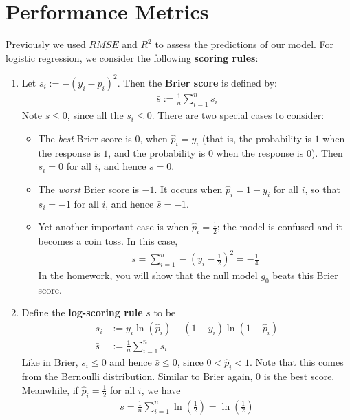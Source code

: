 \documentclass[12pt, a4paper]{article}
\theoremstyle{definition}
\begin{document}
	\section*{Performance Metrics}
	Previously we used $RMSE$ and $R^2$ to assess the predictions of our model.
	For logistic regression, we consider the following \textbf{scoring rules}:
	\begin{enumerate}[label=(\arabic*)]
		\item Let $s_i := -(y_i - \hat{p}_i)^2$. Then the \textbf{Brier score} is defined by:
		\begin{align*}
			\bar{s} := \frac{1}{n}\sum_{i=1}^{n}s_i
		\end{align*}
		Note $\bar{s}\leq 0$, since all the $s_i\leq 0$. There are two special cases to consider:
		\begin{itemize}
			\item The \textit{best} Brier score is $0$, when $\hat{p}_i=y_i$
			(that is, the probability is $1$ when the response is $1$, and the probability
			is $0$ when the response is $0$). Then $s_i=0$ for all $i$, and hence
			$\bar{s}=0$.
			\item The \textit{worst} Brier score is $-1$. It occurs when $\hat{p}_i=1-y_i$
			for all $i$, so that $s_i=-1$ for all $i$, and hence $\bar{s}=-1$.
			\item Yet another important case is when $\hat{p}_i = \frac{1}{2}$; the model
			is confused and it becomes a coin toss. In this case,
			\begin{align*}
				\bar{s}=\sum_{i=1}^{n}-\left(y_i - \frac{1}{2}\right)^2 = -\frac{1}{4}
			\end{align*}
			In the homework, you will show that the null model $g_0$ beats this Brier score.
		\end{itemize}
		\item Define the \textbf{log-scoring rule} $\bar{s}$ to be
		\begin{align*}
			s_i &:= y_i\ln(\hat{p}_i) + (1- y_i)\ln(1-\hat{p}_i)\\
			\bar{s} &:= \frac{1}{n}\sum_{i=1}^{n}s_i
		\end{align*}
		Like in Brier, $s_i\leq 0$ and hence $\bar{s}\leq 0$, since $0<\hat{p}_i<1$.
		Note that this comes from the Bernoulli distribution.
		Similar to Brier again, $0$ is the best score.
		Meanwhile, if $\hat{p}_i=\frac{1}{2}$ for all $i$, we have
		\begin{align*}
			\bar{s} = \frac{1}{n}\sum_{i=1}^{n}\ln\left(\frac{1}{2}\right)=\ln\left(\frac{1}{2}\right)
		\end{align*}
	\end{enumerate}
	\pagebreak
	\printbibliography
\end{document}
